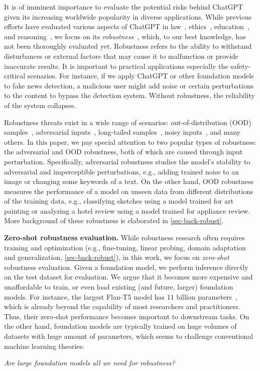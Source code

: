 \documentclass[11pt]{article}
\newcommand{\chat}{ChatGPT\xspace}
\begin{document}
It is of imminent importance to evaluate the potential risks behind \chat given its increasing worldwide popularity in diverse applications.
While previous efforts have evaluated various aspects of \chat in law~\cite{choi2023chatgpt}, ethics~\cite{shen2023chatgpt}, education~\cite{khalil2023will}, and reasoning~\cite{bang2023multitask}, we focus on its \emph{robustness}~\cite{bengio2021deep}, which, to our best knowledge, has not been thoroughly evaluated yet.
Robustness refers to the ability to withstand disturbances or external factors that may cause it to malfunction or provide inaccurate results.
It is important to practical applications especially the safety-critical scenarios.
For instance, if we apply \chat or other foundation models to fake news detection, a malicious user might add noise or certain perturbations to the content to bypass the detection system.
Without robustness, the reliability of the system collapses.

Robustness threats exist in a wide range of scenarios: out-of-distribution (OOD) samples~\cite{wang2022generalizing}, adversarial inputs~\cite{goodfellow2014explaining}, long-tailed samples~\cite{zhang2021deep}, noisy inputs~\cite{natarajan2013learning}, and many others.
In this paper, we pay special attention to two popular types of robustness: the adversarial and OOD robustness, both of which are caused through input perturbation.
Specifically, adversarial robustness studies the model's stability to adversarial and imperceptible perturbations, e.g., adding trained noise to an image or changing some keywords of a text.
On the other hand, OOD robustness measures the performance of a model on unseen data from different distributions of the training data, e.g., classifying sketches using a model trained for art painting or analyzing a hotel review using a model trained for appliance review.
More background of these robustness is elaborated in \cref{sec-back-robust}.



\textbf{Zero-shot robustness evaluation.}
While robustness research often requires training and optimization (e.g., fine-tuning, linear probing, domain adaptation and generalization, \cref{sec-back-robust}), in this work, we focus on \emph{zero-shot} robustness evaluation.
Given a foundation model, we perform inference directly on the test dataset for evaluation.
We argue that it becomes more expensive and unaffordable to train, or even load existing (and future, larger) foundation models.
For instance, the largest Flan-T5 model has $11$ billion parameters~\cite{chung2022scaling}, which is already beyond the capability of most researchers and practitioners.
Thus, their zero-shot performance becomes important to downstream tasks.
On the other hand, foundation models are typically trained on huge volumes of datasets with huge amount of parameters, which seems to challenge conventional machine learning theories:
\begin{center}
    \emph{Are large foundation models all we need for robustness?}
\end{center}
\end{document}
